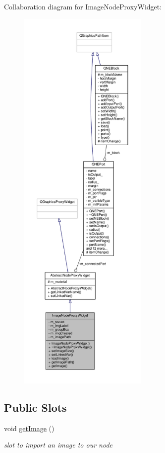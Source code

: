 Collaboration diagram for Image\-Node\-Proxy\-Widget\-:
\nopagebreak
\begin{figure}[H]
\begin{center}
\leavevmode
\includegraphics[height=550pt]{class_image_node_proxy_widget__coll__graph}
\end{center}
\end{figure}
\subsection*{Public Slots}
\begin{DoxyCompactItemize}
\item 
\hypertarget{class_image_node_proxy_widget_afb9272f0af02e0d8b5d70f2b7eb246eb}{void \hyperlink{class_image_node_proxy_widget_afb9272f0af02e0d8b5d70f2b7eb246eb}{get\-Image} ()}\label{class_image_node_proxy_widget_afb9272f0af02e0d8b5d70f2b7eb246eb}

\begin{DoxyCompactList}\small\item\em slot to import an image to our node \end{DoxyCompactList}\end{DoxyCompactItemize}

